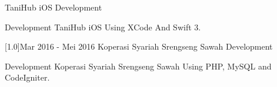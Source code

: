 \documentclass[english]{cv-style}
\begin{document}
\begin{entrylist}
{TaniHub iOS Development}
{}
{\vspace{-0.3cm}
  \begin{itemize}\small{
    \item Development TaniHub iOS Using XCode And Swift 3.}
  \end{itemize}}
\entry
{\scalebox{.6}[1.0]{Mar 2016 - Mei 2016}}
{Koperasi Syariah Srengseng Sawah Development}
{}
{\vspace{-0.3cm}
  \begin{itemize}\small{
    \item Development Koperasi Syariah Srengseng Sawah Using PHP, MySQL and CodeIgniter.}
  \end{itemize}}
\end{entrylist}
\end{document}
